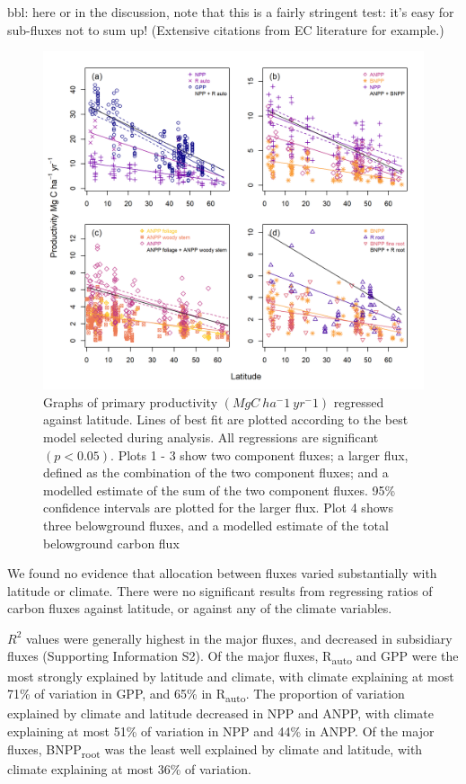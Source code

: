 \documentclass[]{article}
\begin{document}
bbl: here or in the discussion, note that this is a fairly stringent
test: it's easy for sub-fluxes not to sum up! (Extensive citations from
EC literature for example.)

\begin{figure}[H]
\includegraphics[width=1\linewidth]{combined_stacked} \caption{Graphs of primary productivity $(MgC~ha^-1~yr^-1)$ regressed against latitude. Lines of best fit are plotted according to the best model selected during analysis. All regressions are significant $(p<0.05)$. Plots 1 - 3 show two component fluxes; a larger flux, defined as the combination of the two component fluxes; and a modelled estimate of the sum of the two component fluxes. 95\% confidence intervals are plotted for the larger flux. Plot 4 shows three belowground fluxes, and a modelled estimate of the total belowground carbon flux}\label{fig:unnamed-chunk-7}
\end{figure}

We found no evidence that allocation between fluxes varied substantially
with latitude or climate. There were no significant results from
regressing ratios of carbon fluxes against latitude, or against any of
the climate variables.

\(R^2\) values were generally highest in the major fluxes, and decreased
in subsidiary fluxes (Supporting Information S2). Of the major fluxes,
R\textsubscript{auto} and GPP were the most strongly explained by
latitude and climate, with climate explaining at most 71\% of variation
in GPP, and 65\% in R\textsubscript{auto}. The proportion of variation
explained by climate and latitude decreased in NPP and ANPP, with
climate explaining at most 51\% of variation in NPP and 44\% in ANPP. Of
the major fluxes, BNPP\textsubscript{root} was the least well explained
by climate and latitude, with climate explaining at most 36\% of
variation.
\end{document}
